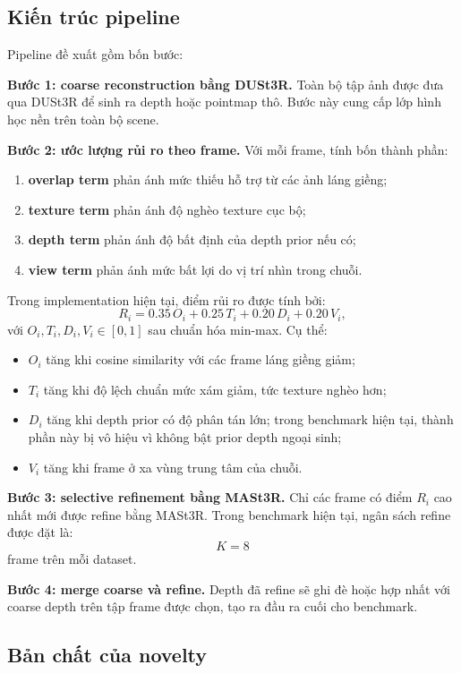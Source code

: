 \documentclass[11pt,a4paper]{article}
\begin{document}
\subsection{Kiến trúc pipeline}

Pipeline đề xuất gồm bốn bước:

\textbf{Bước 1: coarse reconstruction bằng DUSt3R.}
Toàn bộ tập ảnh được đưa qua DUSt3R để sinh ra depth hoặc pointmap thô. Bước này cung cấp lớp hình học nền trên toàn bộ scene.

\textbf{Bước 2: ước lượng rủi ro theo frame.}
Với mỗi frame, tính bốn thành phần:
\begin{enumerate}[leftmargin=1.5em]
  \item \textbf{overlap term} phản ánh mức thiếu hỗ trợ từ các ảnh láng giềng;
  \item \textbf{texture term} phản ánh độ nghèo texture cục bộ;
  \item \textbf{depth term} phản ánh độ bất định của depth prior nếu có;
  \item \textbf{view term} phản ánh mức bất lợi do vị trí nhìn trong chuỗi.
\end{enumerate}

Trong implementation hiện tại, điểm rủi ro được tính bởi:
\[
R_i = 0.35\,O_i + 0.25\,T_i + 0.20\,D_i + 0.20\,V_i,
\]
với $O_i, T_i, D_i, V_i \in [0,1]$ sau chuẩn hóa min-max. Cụ thể:
\begin{itemize}[leftmargin=1.5em]
  \item $O_i$ tăng khi cosine similarity với các frame láng giềng giảm;
  \item $T_i$ tăng khi độ lệch chuẩn mức xám giảm, tức texture nghèo hơn;
  \item $D_i$ tăng khi depth prior có độ phân tán lớn; trong benchmark hiện tại, thành phần này bị vô hiệu vì không bật prior depth ngoại sinh;
  \item $V_i$ tăng khi frame ở xa vùng trung tâm của chuỗi.
\end{itemize}

\textbf{Bước 3: selective refinement bằng MASt3R.}
Chỉ các frame có điểm $R_i$ cao nhất mới được refine bằng MASt3R. Trong benchmark hiện tại, ngân sách refine được đặt là:
\[
K = 8
\]
frame trên mỗi dataset.

\textbf{Bước 4: merge coarse và refine.}
Depth đã refine sẽ ghi đè hoặc hợp nhất với coarse depth trên tập frame được chọn, tạo ra đầu ra cuối cho benchmark.

\subsection{Bản chất của novelty}
\end{document}
